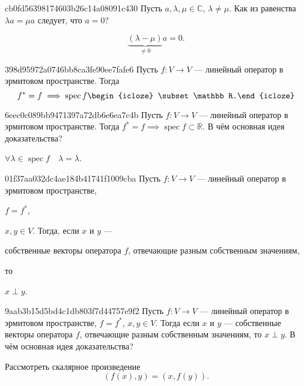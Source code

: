 \begin{note}{cb0fd56398174603b26c14a08091c430}
    Пусть \({ a, \lambda, \mu \in \mathbb C }\),\: \({ \lambda \neq \mu }\). Как из равенства \({ \lambda a = \mu a }\) следует, что \({ a = 0 }\)?

    \begin{cloze}{1}
        \[
            \underbrace{(\lambda - \mu)}_{\neq 0} a = 0.
        \]
    \end{cloze}
\end{note}

\begin{note}{398d95972a0746bb8ca3fe90ee7fafe6}
    Пусть \({ f : V \to V }\) --- линейный оператор в эрмитовом пространстве.
    Тогда
    \[
        f^* = f \implies \operatorname{spec} f \begin{icloze}{1}\subset \mathbb R.\end{icloze}
    \]
\end{note}

\begin{note}{6eec0c089bb9471397a72db6e6ea7c4b}
    Пусть \({ f : V \to V }\) --- линейный оператор в эрмитовом пространстве.
    Тогда \({ f^* = f \implies \operatorname{spec} f \subset \mathbb R }\).
    В чём основная идея доказательства?

    \begin{cloze}{1}
        \({ \forall \lambda \in \operatorname{spec} f \quad \lambda = \overline{\lambda} }\).
    \end{cloze}
\end{note}

\begin{note}{01f37aa032dc4ae184b41741f1009cba}
    Пусть \({ f : V \to V }\) --- линейный оператор в эрмитовом пространстве, \begin{icloze}{3}\({ f = f^* }\),\end{icloze}\: \({ x, y \in V }\).
    Тогда, если \({ x }\) и \({ y }\) --- \begin{icloze}{1}собственные векторы оператора \({ f }\), отвечающие разным собственным значениям,\end{icloze} то \begin{icloze}{2}\({ x \perp y }\).\end{icloze}
\end{note}

\begin{note}{9aab3b15d5bd4c1db803f7d44757e9f2}
    Пусть \({ f : V \to V }\) --- линейный оператор в эрмитовом пространстве, \({ f = f^* }\),\: \({ x, y \in V }\).
    Тогда если \({ x }\) и \({ y }\) --- собственные векторы оператора \({ f }\), отвечающие разным собственным значениям, то \({ x \perp y }\).
    В чём основная идея доказательства?

    \begin{cloze}{1}
        Рассмотреть скалярное произведение
        \[
            (f(x), y) = (x, f(y)).
        \]
    \end{cloze}
\end{note}

